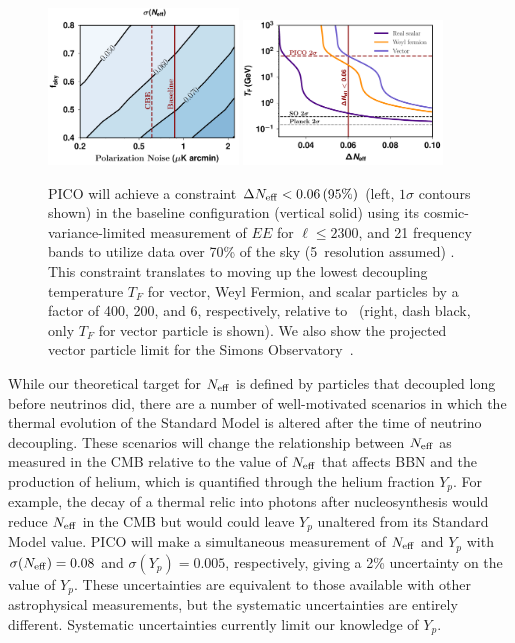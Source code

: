 \documentclass[PICOReport.tex]{subfiles}
\begin{document}
\begin{figure}[t!]
\begin{center}
\includegraphics[width=0.45\textwidth]{images/Neff_final.pdf}
\includegraphics[width=0.47\textwidth]{images/Tf_pico.pdf}
\vspace{-0.15in}
\caption{ \captiontext PICO will achieve a constraint $\Delta {N_{\rm eff}} < 0.06\, (95\%)$ (left, $1\sigma$ contours shown) in the baseline configuration (vertical solid) using its cosmic-variance-limited measurement of $EE$ for $\ell \leq 2300$, and 21 frequency bands to utilize data over 70\% of the sky (5\arcmin\ resolution assumed) . This constraint translates to moving up the lowest decoupling temperature $T_{F}$ for vector, Weyl Fermion, and scalar particles by a factor of 400, 200, and 6, respectively, relative to \planck\ (right, dash black, only $T_{F}$ for vector particle is shown). We also show the projected vector particle limit for the Simons Observatory~\citep{SOscience}. }
\label{fig:Neff_future}  
\end{center}
\vspace{-0.15in}
\end{figure}

While our theoretical target for ${N_{\rm eff}}$ is defined by particles that decoupled long before neutrinos did, there are a number of well-motivated scenarios in which the thermal evolution of the Standard Model is altered after the time of neutrino decoupling.  These scenarios will change the relationship between ${N_{\rm eff}}$ as measured in the CMB relative to the value of ${N_{\rm eff}}$ that affects BBN and the production of helium, which is quantified through the helium fraction $Y_p$.  For example, the decay of a thermal relic into photons after nucleosynthesis would reduce ${N_{\rm eff}}$ in the CMB but would could leave $Y_p$ unaltered from its Standard Model value.  PICO will make a simultaneous measurement of ${N_{\rm eff}}$ and $Y_p$ with $\sigma({N_{\rm eff}}) = 0.08$ and $\sigma(Y_p) =0.005$, respectively, giving a 2\% uncertainty on the value of $Y_p$. These uncertainties are equivalent to those available with other astrophysical measurements, but the systematic uncertainties are entirely different. Systematic uncertainties currently limit our knowledge of $Y_{p}$. 
\end{document}
